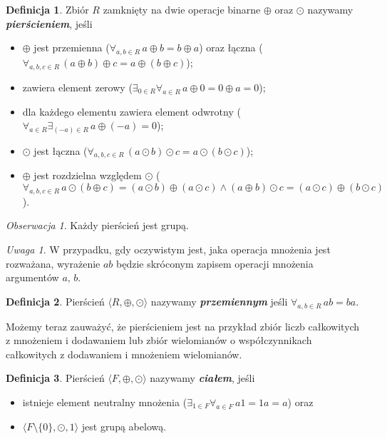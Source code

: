 \documentclass[polish,declaration,shortabstract]{iithesis}
\theoremstyle{definition}
\newtheorem{definition}{Definicja}
\theoremstyle{remark} \newtheorem{observation}{Obserwacja}
\theoremstyle{plain} \newtheorem{theorem}{Twierdzenie}
\theoremstyle{plain} \newtheorem{lemma}{Lemat}
\theoremstyle{remark} \newtheorem*{remark*}{Uwaga}
\theoremstyle{reminder} \newtheorem*{reminder*}{Przypomnienie}
\begin{document}
\theoremstyle{definition} 
\begin{definition}
	Zbiór $R$ zamknięty na dwie operacje binarne $\oplus$ oraz $\odot$ nazywamy \textit{\textbf{pierścieniem}}, jeśli 
	\begin{itemize}[leftmargin=.4in]
		\item $\oplus$ jest przemienna ($\forall_{a, b \in R} \, a \oplus b = b \oplus a$) oraz łączna ($\forall_{a, b, c \in R} \, (a \oplus b) \oplus c = a \oplus (b \oplus c)$);
		\item zawiera element zerowy ($\exists_{0 \in R} \forall_{a \in R} \, a \oplus 0 = 0 \oplus a = 0$);
		\item dla każdego elementu zawiera element odwrotny ($\forall_{a \in R} \exists_{(-a) \in R} \, a \oplus (-a) = 0$);
		\item $\odot$ jest łączna ($\forall_{a, b, c \in R} \, (a \odot b) \odot c = a \odot (b \odot c)$);
		\item $\oplus$ jest rozdzielna względem $\odot$ ($\forall_{a, b, c \in R} \, a \odot (b \oplus c) = (a \odot b) \oplus (a \odot c) \wedge (a \oplus b) \odot c = (a \odot c) \oplus (b \odot c)$).
	\end{itemize}
\end{definition}

\theoremstyle{observation}
\begin{observation}
	Każdy pierścień jest grupą.
\end{observation}

\begin{remark*}
	W przypadku, gdy oczywistym jest, jaka operacja mnożenia jest rozważana, wyrażenie $ab$ będzie skróconym zapisem operacji mnożenia argumentów $a, \,b$.
\end{remark*}

\theoremstyle{definition}
\begin{definition}
	Pierścień $\langle R, \oplus, \odot \rangle$ nazywamy \textit{\textbf{przemiennym}} jeśli $\forall_{a, b \in R} \, ab = ba$.
\end{definition}

Możemy teraz zauważyć, że pierścieniem jest na przykład zbiór liczb całkowitych z mnożeniem i dodawaniem lub zbiór wielomianów o współczynnikach całkowitych z dodawaniem i mnożeniem wielomianów.

\theoremstyle{definition} 
\begin{definition} \label{cialo}
	Pierścień $\langle F, \oplus, \odot \rangle$ nazywamy \textit{\textbf{ciałem}}, jeśli 
	\begin{itemize}[leftmargin=.4in]
		\item istnieje element neutralny mnożenia ($\exists_{1 \in F} \forall_{a \in F} \, a1 = 1a = a$) oraz
		\item $\langle F \setminus \{0\}, \odot, 1 \rangle$ jest grupą abelową.
	\end{itemize}
\end{definition}
\end{document}
